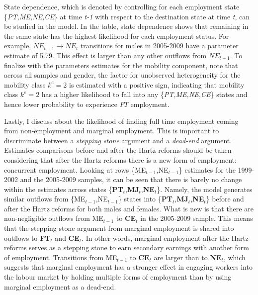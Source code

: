 \documentclass[12pt, a4paper]{article}
\begin{document}
State dependence, which is denoted by controlling for each employment state \{\emph{PT,ME,NE,CE}\} at time \emph{t-1} with respect to the destination state at time \emph{t}, can be studied in the model. In the table, state dependence shows that remaining in the same state has the highest likelihood for each employment status. For example, $NE_{t-1}\rightarrow NE_{t}$ transitions for males in 2005-2009 have a parameter estimate of 5.79. This effect is larger than any other outflows from $NE_{t-1}$. To finalize with the parameters estimates for the mobility component, note that across all samples and gender, the factor for unobserved heterogeneity for the mobility class $k^e = 2$ is estimated with a positive sign, indicating that mobility class $k^e = 2$ has a higher likelihood to fall into any \{\emph{PT,ME,NE,CE}\} states and hence lower probability to experience $FT$ employment.

Lastly, I discuss about the likelihood of finding full time employment coming from non-employment and marginal employment. This is important to discriminate between a \emph{stepping stone} argument and a \emph{dead-end} argument. Estimates comparisons before and after the Hartz reforms should be taken considering that after the Hartz reforms there is a new form of employment: concurrent employment. Looking at rows \{ME$_{t-1}$,NE$_{t-1}$\} estimates for the 1999-2002 and the 2005-2009 samples, it can be seen that there is barely no change within the estimates across states \{\textbf{PT}$_{t}$,\textbf{MJ}$_{t}$,\textbf{NE}$_{t}$\}. Namely, the model generates similar outflows from \{ME$_{t-1}$,NE$_{t-1}$\} states into \{\textbf{PT}$_{t}$,\textbf{MJ}$_{t}$,\textbf{NE}$_{t}$\} before and after the Hartz reforms for both males and females. What is new is that there are non-negligible outflows from ME$_{t-1}$ to \textbf{CE}$_{t}$ in the 2005-2009 sample. This means that the stepping stone argument from marginal employment is shared into outflows to \textbf{FT}$_{t}$ and \textbf{CE}$_{t}$. In other words, marginal employment after the Hartz reforms serves as a stepping stone to earn secondary earnings with another form of employment. Transitions from ME$_{t-1}$ to \textbf{CE}$_{t}$ are larger than to \textbf{NE}$_{t}$, which suggests that marginal employment has a stronger effect in engaging workers into the labour market by holding multiple forms of employment than by using marginal employment as a dead-end.  

\end{document}
